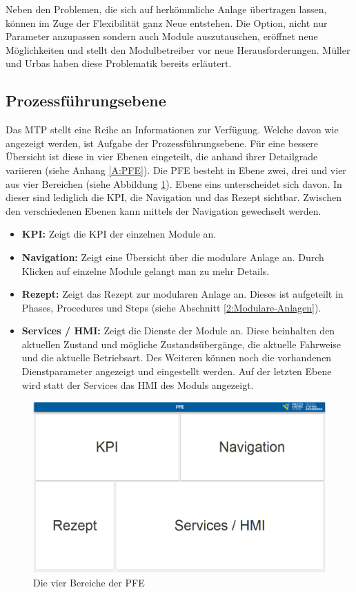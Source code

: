 Neben den Problemen, die sich auf herkömmliche Anlage übertragen lassen, können im Zuge der Flexibilität ganz Neue entstehen. Die Option, nicht nur Parameter anzupassen sondern auch Module auszutauschen, eröffnet neue Möglichkeiten und stellt den Modulbetreiber vor neue Herausforderungen. Müller und Urbas \cite{Muller2017} haben diese Problematik bereits erläutert.

\subsection{Prozessführungsebene}
\label{3:PFE}
Das MTP stellt eine Reihe an Informationen zur Verfügung. Welche davon wie angezeigt werden, ist Aufgabe der Prozessführungsebene. Für eine bessere Übersicht ist diese in vier Ebenen eingeteilt, die anhand ihrer Detailgrade variieren (siehe Anhang \ref{A:PFE}). Die PFE besteht in Ebene zwei, drei und vier aus vier Bereichen (siehe Abbildung \ref{pic:Bereiche-PFE}). Ebene eins unterscheidet sich davon. In dieser sind lediglich die KPI, die Navigation und das Rezept sichtbar. Zwischen den verschiedenen Ebenen kann mittels der Navigation gewechselt werden. \cite{Hensel2019}
\begin{itemize}
\item \textbf{KPI:} Zeigt die KPI der einzelnen Module an.
\item \textbf{Navigation:} Zeigt eine Übersicht über die modulare Anlage an. Durch Klicken auf einzelne Module gelangt man zu mehr Details.
\item \textbf{Rezept:} Zeigt das Rezept zur modularen Anlage an. Dieses ist aufgeteilt in Phases, Procedures und Steps (siehe Abschnitt \ref{2:Modulare-Anlagen}).
\item \textbf{Services / HMI:} Zeigt die Dienste der Module an. Diese beinhalten den aktuellen Zustand und mögliche Zustandsübergänge, die aktuelle Fahrweise und die aktuelle Betriebsart. Des Weiteren können noch die vorhandenen Dienstparameter angezeigt und eingestellt werden. Auf der letzten Ebene wird statt der Services das HMI des Moduls angezeigt.
\end{itemize}
\begin{figure}[h]
\centering
\includegraphics[scale=0.25]{DA_files/Bilder/Analyse/PFE-Bereiche.png}
\caption{Die vier Bereiche der PFE}
\label{pic:Bereiche-PFE}
\end{figure}

